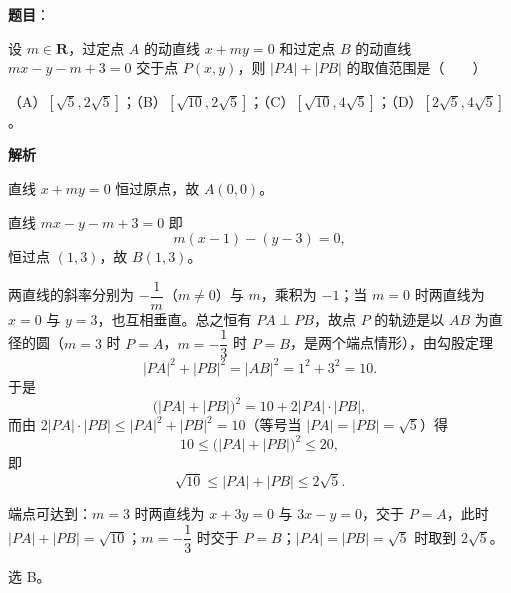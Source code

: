 \begin{answer}

\textbf{题目}：

设 $m\in\mathbf R$，过定点 $A$ 的动直线 $x+my=0$ 和过定点 $B$ 的动直线 $mx-y-m+3=0$ 交于点 $P(x,y)$，则 $|PA|+|PB|$ 的取值范围是\mbox{（　　）}

（A）$[\sqrt5,2\sqrt5]$；（B）$[\sqrt{10},2\sqrt5]$；（C）$[\sqrt{10},4\sqrt5]$；（D）$[2\sqrt5,4\sqrt5]$。

\textbf{解析}

直线 $x+my=0$ 恒过原点，故 $A(0,0)$。

直线 $mx-y-m+3=0$ 即
\nopagebreak[4]
\[m(x-1)-(y-3)=0,\]
恒过点 $(1,3)$，故 $B(1,3)$。

两直线的斜率分别为 $-\dfrac1m$（$m\neq0$）与 $m$，乘积为 $-1$；当 $m=0$ 时两直线为 $x=0$ 与 $y=3$，也互相垂直。总之恒有 $PA\perp PB$，故点 $P$ 的轨迹是以 $AB$ 为直径的圆（$m=3$ 时 $P=A$，$m=-\dfrac13$ 时 $P=B$，是两个端点情形），由勾股定理
\nopagebreak[4]
\[|PA|^2+|PB|^2=|AB|^2=1^2+3^2=10 .\]
于是
\nopagebreak[4]
\[\bigl(|PA|+|PB|\bigr)^2=10+2|PA|\cdot|PB|,\]
而由 $2|PA|\cdot|PB|\leqslant |PA|^2+|PB|^2=10$（等号当 $|PA|=|PB|=\sqrt5$）得
\nopagebreak[4]
\[10\leqslant\bigl(|PA|+|PB|\bigr)^2\leqslant 20,\]
即
\nopagebreak[4]
\[\sqrt{10}\leqslant|PA|+|PB|\leqslant 2\sqrt5 .\]

端点可达到：$m=3$ 时两直线为 $x+3y=0$ 与 $3x-y=0$，交于 $P=A$，此时 $|PA|+|PB|=\sqrt{10}$；$m=-\dfrac13$ 时交于 $P=B$；$|PA|=|PB|=\sqrt5$ 时取到 $2\sqrt5$。

选 B。


\end{answer}
